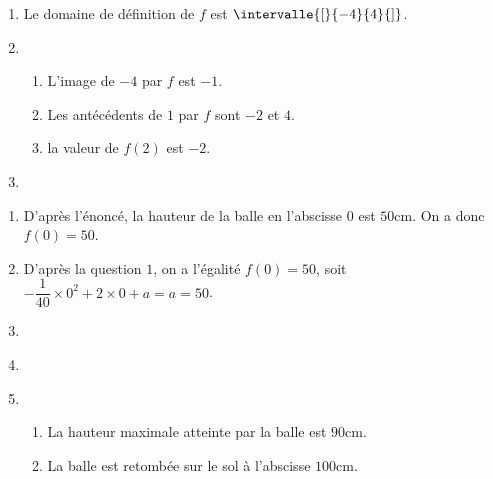 \documentclass[
	classe=$2^{de}$
]{évaluation}
\newcommand{\makeCorrection}{}
\begin{document}
\begin{exercice}
	\begin{enumerate}
		\item Le domaine de définition de $f$ est $\intervalle{[}{-4}{4}{]}$.
		\item
		      \begin{enumerate}
			      \item L'image de $-4$ par $f$ est $-1$.
			      \item Les antécédents de $1$ par $f$ sont $-2$ et $4$.
			      \item la valeur de $f(2)$ est $-2$.
		      \end{enumerate}
		\item \
		      \begin{center}
		      \end{center}
	\end{enumerate}
\end{exercice}

\begin{exercice}
	\begin{enumerate}
		\item D'après l'énoncé, la hauteur de la balle en l'abscisse $0$ est $50$cm. On a donc $f(0) = 50$.
		\item D'après la question $1$, on a l'égalité $f(0) = 50$, soit $-\dfrac{1}{40}×0^2 + 2×0 + a = a = 50$.
		\item \

		      \begin{center}
		      \end{center}
		\item \

		      \begin{center}
		      \end{center}
		\item
		      \begin{enumerate}
			      \item La hauteur maximale atteinte par la balle est $90$cm.
			      \item La balle est retombée sur le sol à l'abscisse $100$cm.
		      \end{enumerate}
	\end{enumerate}
\end{exercice}
\end{document}

